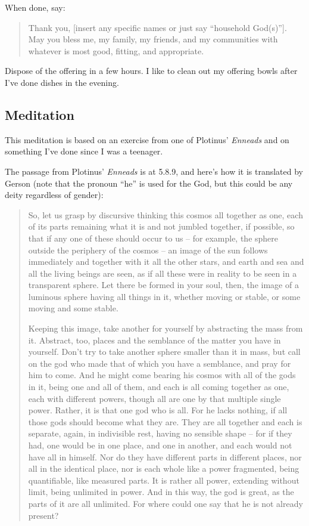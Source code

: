 \documentclass[
]{book}
\begin{document}
When done, say:

\begin{quote}
Thank you, {[}insert any specific names or just say ``household God(s)''{]}. May you bless me, my family, my friends, and my communities with whatever is most good, fitting, and appropriate.
\end{quote}

Dispose of the offering in a few hours. I like to clean out my offering bowls after I've done dishes in the evening.

\hypertarget{meditation}{%
\subsection{Meditation}\label{meditation}}

This meditation is based on an exercise from one of Plotinus' \emph{Enneads} and on something I've done since I was a teenager.

The passage from Plotinus' \emph{Enneads} is at 5.8.9, and here's how it is translated by Gerson (note that the pronoun ``he'' is used for the God, but this could be any deity regardless of gender):

\begin{quote}
So, let us grasp by discursive thinking this cosmos all together as one, each of its parts remaining what it is and not jumbled together, if possible, so that if any one of these should occur to us -- for example, the sphere outside the periphery of the cosmos -- an image of the sun follows immediately and together with it all the other stars, and earth and sea and all the living beings are seen, as if all these were in reality to be seen in a transparent sphere. Let there be formed in your soul, then, the image of a luminous sphere having all things in it, whether moving or stable, or some moving and some stable.

Keeping this image, take another for yourself by abstracting the mass from it. Abstract, too, places and the semblance of the matter you have in yourself. Don't try to take another sphere smaller than it in mass, but call on the god who made that of which you have a semblance, and pray for him to come. And he might come bearing his cosmos with all of the gods in it, being one and all of them, and each is all coming together as one, each with different powers, though all are one by that multiple single power. Rather, it is that one god who is all. For he lacks nothing, if all those gods should become what they are. They are all together and each is separate, again, in indivisible rest, having no sensible shape -- for if they had, one would be in one place, and one in another, and each would not have all in himself. Nor do they have different parts in different places, nor all in the identical place, nor is each whole like a power fragmented, being quantifiable, like measured parts. It is rather all power, extending without limit, being unlimited in power. And in this way, the god is great, as the parts of it are all unlimited. For where could one say that he is not already present?
\end{quote}
\end{document}
